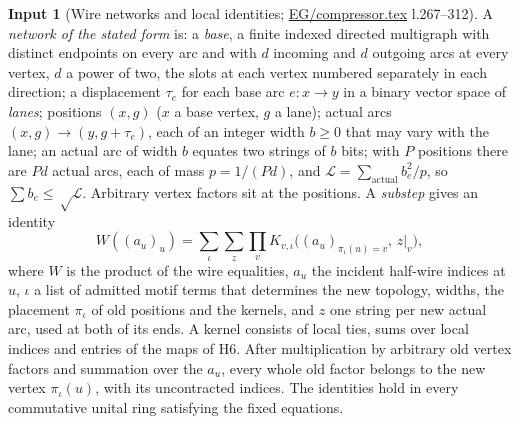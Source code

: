 \documentclass[11pt]{article}
\theoremstyle{definition}
\newtheorem{hyp}{Input}
\theoremstyle{remark}
\newcommand{\LL}{\mathcal L}
\newcommand{\src}[1]{\url{#1}}
\begin{document}
\begin{hyp}[Wire networks and local identities; \src{EG/compressor.tex} l.267--312]\label{H7}
A \emph{network of the stated form} is: a \emph{base}, a finite indexed directed multigraph with distinct endpoints on every arc
and with $d$ incoming and $d$ outgoing arcs at every vertex, $d$ a power of two, the slots at each vertex numbered separately in
each direction; a displacement $\tau_e$ for each base arc $e:x\to y$ in a binary vector space of \emph{lanes}; positions $(x,g)$
($x$ a base vertex, $g$ a lane); actual arcs $(x,g)\to(y,g+\tau_e)$, each of an integer width $b\ge0$ that may vary with the
lane; an actual arc of width $b$ equates two strings of $b$ bits; with $P$ positions there are $Pd$ actual arcs, each of mass
$p=1/(Pd)$, and $\LL=\sum_{\text{actual}}b_e^2/p$, so $\sum b_e\le\sqrt\LL$. Arbitrary vertex factors sit at the positions.
A \emph{substep} gives an identity
\begin{equation}\label{eq:kernel}
 W((a_u)_u)=\sum_\iota\sum_z\prod_vK_{v,\iota}\bigl((a_u)_{\pi_\iota(u)=v},\,z|_v\bigr),
\end{equation}
where $W$ is the product of the wire equalities, $a_u$ the incident half-wire indices at $u$, $\iota$ a list of admitted motif
terms that determines the new topology, widths, the placement $\pi_\iota$ of old positions and the kernels, and $z$ one string
per new actual arc, used at both of its ends. A kernel consists of local ties, sums over local indices and entries of the maps of
H6. After multiplication by arbitrary old vertex factors and summation over the $a_u$, every whole old factor belongs to the new
vertex $\pi_\iota(u)$, with its uncontracted indices. The identities hold in every commutative unital ring satisfying the fixed
equations.
\end{hyp}
\end{document}
